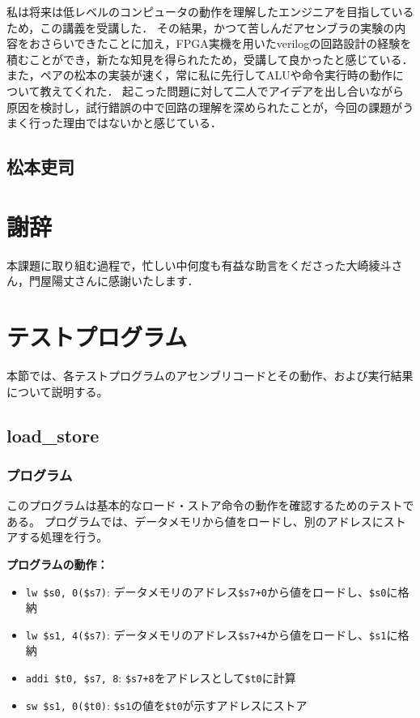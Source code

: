 \documentclass[dvipdfmx]{jsarticle}
\begin{document}
私は将来は低レベルのコンピュータの動作を理解したエンジニアを目指しているため，この講義を受講した．
その結果，かつて苦しんだアセンブラの実験の内容をおさらいできたことに加え，FPGA実機を用いたverilogの回路設計の経験を積むことができ，新たな知見を得られたため，受講して良かったと感じている．
また，ペアの松本の実装が速く，常に私に先行してALUや命令実行時の動作について教えてくれた．
起こった問題に対して二人でアイデアを出し合いながら原因を検討し，試行錯誤の中で回路の理解を深められたことが，今回の課題がうまく行った理由ではないかと感じている．

\subsection{松本吏司}


\section*{謝辞}
本課題に取り組む過程で，忙しい中何度も有益な助言をくださった大崎綾斗さん，門屋陽丈さんに感謝いたします．

\appendix
\section{テストプログラム}

本節では、各テストプログラムのアセンブリコードとその動作、および実行結果について説明する。

\subsection{load\_store}
\label{appendix:load_store}

\subsubsection{プログラム}
このプログラムは基本的なロード・ストア命令の動作を確認するためのテストである。
プログラムでは、データメモリから値をロードし、別のアドレスにストアする処理を行う。



\textbf{プログラムの動作：}
\begin{itemize}
\item \texttt{lw \$s0, 0(\$s7)}: データメモリのアドレス\texttt{\$s7+0}から値をロードし、\texttt{\$s0}に格納
\item \texttt{lw \$s1, 4(\$s7)}: データメモリのアドレス\texttt{\$s7+4}から値をロードし、\texttt{\$s1}に格納  
\item \texttt{addi \$t0, \$s7, 8}: \texttt{\$s7+8}をアドレスとして\texttt{\$t0}に計算
\item \texttt{sw \$s1, 0(\$t0)}: \texttt{\$s1}の値を\texttt{\$t0}が示すアドレスにストア
\end{itemize}
\end{document}
